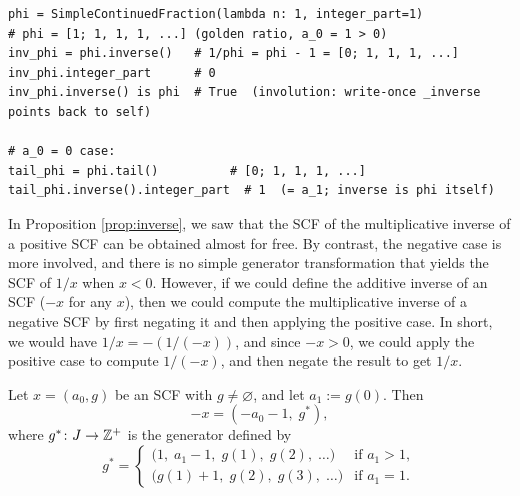 \begin{catenadef}
\begin{lstlisting}[style=python]
phi = SimpleContinuedFraction(lambda n: 1, integer_part=1)
# phi = [1; 1, 1, 1, ...] (golden ratio, a_0 = 1 > 0)
inv_phi = phi.inverse()   # 1/phi = phi - 1 = [0; 1, 1, 1, ...]
inv_phi.integer_part      # 0
inv_phi.inverse() is phi  # True  (involution: write-once _inverse points back to self)

# a_0 = 0 case:
tail_phi = phi.tail()          # [0; 1, 1, 1, ...]
tail_phi.inverse().integer_part  # 1  (= a_1; inverse is phi itself)
\end{lstlisting}
\end{catenadef}

\begin{remark}
    In Proposition \ref{prop:inverse}, we saw that the SCF of the multiplicative inverse of a 
    positive SCF can be obtained almost for free. By contrast, the negative case is more involved, 
    and there is no simple generator transformation that yields the SCF of $1/x$ when $x < 0$. However,
    if we could define the additive inverse of an SCF ($-x$ for any $x$), then we could compute 
    the multiplicative inverse of a negative SCF by first negating it and then applying the positive case.
    In short, we would have $1/x = -(1/(-x))$, and since $-x > 0$, we could apply the positive case 
    to compute $1/(-x)$, and then negate the result to get $1/x$.
\end{remark}

\begin{proposition}
    \label{prop:neg}
  Let $x = (a_0, g)$ be an SCF with $g \neq \varnothing$, and let $a_1 := g(0)$.
  Then
  \[
    -x = (-a_0 - 1,\; g^*),
  \]
  where $g^* \colon J \to \mathbb{Z}^+$ is the generator defined by
  \[
    g^* =
    \begin{cases}
      \bigl(1,\; a_1 - 1,\; g(1),\; g(2),\; \ldots\bigr) & \text{if } a_1 > 1, \\[4pt]
      \bigl(g(1) + 1,\; g(2),\; g(3),\; \ldots\bigr)     & \text{if } a_1 = 1.
    \end{cases}
  \]
\end{proposition}

